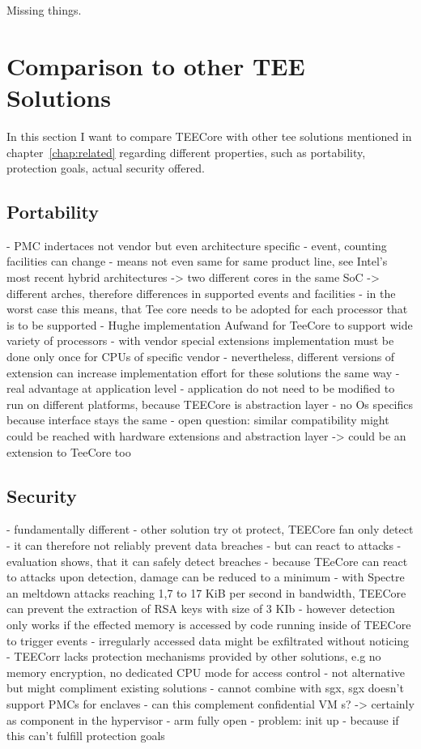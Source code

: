 Missing things. 

\section{Comparison to other TEE Solutions}
In this section I want to compare TEECore with other \gls{tee} solutions
mentioned in chapter~\ref{chap:related} regarding different properties, such as
portability, protection goals, actual security offered.

\subsection{Portability}

- PMC indertaces not vendor but even architecture specific
- event, counting facilities can change
- means not even same for same product line, see Intel's most recent hybrid architectures
-> two different cores in the same SoC
-> different arches, therefore differences in supported events and facilities
- in the worst case this means, that Tee core needs to be adopted for each processor that is to be supported
- Hughe implementation Aufwand for TeeCore to support wide variety of processors
- with vendor special extensions implementation must be done only once for CPUs of specific vendor
- nevertheless, different versions of extension can increase implementation effort for these solutions the same way
- real advantage at application level
- application do not need to be modified to run on different platforms, because TEECore is abstraction layer
- no Os specifics because interface stays the same
- open question: similar compatibility might could be reached with hardware extensions and abstraction layer
-> could be an extension to TeeCore too

\subsection{Security}

- fundamentally different
- other solution try ot protect, TEECore fan only detect
- it can therefore not reliably prevent data breaches
- but can react to attacks
- evaluation shows, that it can safely detect breaches
- because TEeCore can react to attacks upon detection, damage can be reduced to a minimum
- with Spectre an meltdown attacks reaching 1,7 to 17 KiB per second in bandwidth, TEECore can prevent the extraction of RSA keys with size of 3 KIb
- however detection only works if the effected memory is accessed by code running inside of TEECore to trigger events
- irregularly accessed data might be exfiltrated without noticing
- TEECorr lacks protection mechanisms provided by other solutions, e.g no memory encryption, no dedicated CPU mode for access control
- not alternative but might compliment existing solutions
- cannot combine with sgx, sgx doesn't support PMCs for enclaves
- can this complement confidential VM s?
-> certainly as component in the hypervisor
- arm fully open
- problem: init up
- because if this can't fulfill protection goals

\cleardoublepage

